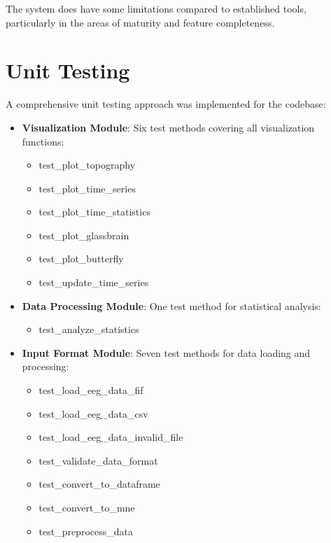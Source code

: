 \documentclass[12pt, titlepage]{article}
\begin{document}
The system does have some limitations compared to established tools, particularly in the areas of maturity and feature completeness.

\section{Unit Testing}

A comprehensive unit testing approach was implemented for the codebase:

\begin{itemize}
    \item \textbf{Visualization Module}: Six test methods covering all visualization functions:
    \begin{itemize}
        \item test\_plot\_topography
        \item test\_plot\_time\_series
        \item test\_plot\_time\_statistics
        \item test\_plot\_glassbrain
        \item test\_plot\_butterfly
        \item test\_update\_time\_series
    \end{itemize}
    
    \item \textbf{Data Processing Module}: One test method for statistical analysis:
    \begin{itemize}
        \item test\_analyze\_statistics
    \end{itemize}
    
    \item \textbf{Input Format Module}: Seven test methods for data loading and processing:
    \begin{itemize}
        \item test\_load\_eeg\_data\_fif
        \item test\_load\_eeg\_data\_csv
        \item test\_load\_eeg\_data\_invalid\_file
        \item test\_validate\_data\_format
        \item test\_convert\_to\_dataframe
        \item test\_convert\_to\_mne
        \item test\_preprocess\_data
    \end{itemize}
\end{itemize}
\end{document}

